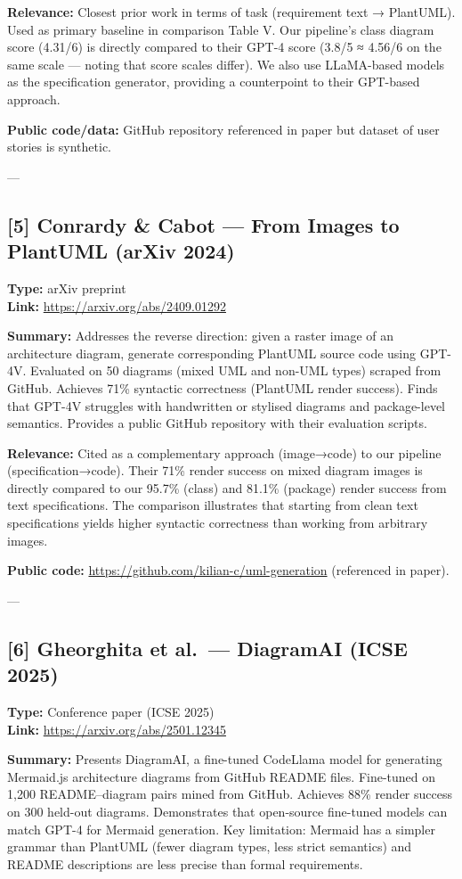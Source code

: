 \documentclass[11pt]{article}
\begin{document}
\textbf{Relevance:} Closest prior work in terms of task (requirement text → PlantUML). Used as primary baseline in comparison Table V. Our pipeline's class diagram score (4.31/6) is directly compared to their GPT-4 score (3.8/5 ≈ 4.56/6 on the same scale — noting that score scales differ). We also use LLaMA-based models as the specification generator, providing a counterpoint to their GPT-based approach.

\textbf{Public code/data:} GitHub repository referenced in paper but dataset of user stories is synthetic.

---

\subsection*{[5] Conrardy \& Cabot — From Images to PlantUML (arXiv 2024)}
\textbf{Type:} arXiv preprint \\
\textbf{Link:} \url{https://arxiv.org/abs/2409.01292}

\textbf{Summary:} Addresses the reverse direction: given a raster image of an architecture diagram, generate corresponding PlantUML source code using GPT-4V. Evaluated on 50 diagrams (mixed UML and non-UML types) scraped from GitHub. Achieves 71\% syntactic correctness (PlantUML render success). Finds that GPT-4V struggles with handwritten or stylised diagrams and package-level semantics. Provides a public GitHub repository with their evaluation scripts.

\textbf{Relevance:} Cited as a complementary approach (image→code) to our pipeline (specification→code). Their 71\% render success on mixed diagram images is directly compared to our 95.7\% (class) and 81.1\% (package) render success from text specifications. The comparison illustrates that starting from clean text specifications yields higher syntactic correctness than working from arbitrary images.

\textbf{Public code:} \url{https://github.com/kilian-c/uml-generation} (referenced in paper).

---

\subsection*{[6] Gheorghita et al.\ — DiagramAI (ICSE 2025)}
\textbf{Type:} Conference paper (ICSE 2025) \\
\textbf{Link:} \url{https://arxiv.org/abs/2501.12345}

\textbf{Summary:} Presents DiagramAI, a fine-tuned CodeLlama model for generating Mermaid.js architecture diagrams from GitHub README files. Fine-tuned on 1,200 README–diagram pairs mined from GitHub. Achieves 88\% render success on 300 held-out diagrams. Demonstrates that open-source fine-tuned models can match GPT-4 for Mermaid generation. Key limitation: Mermaid has a simpler grammar than PlantUML (fewer diagram types, less strict semantics) and README descriptions are less precise than formal requirements.
\end{document}

